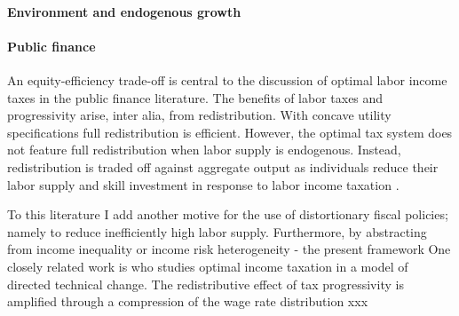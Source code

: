 \paragraph{Environment and endogenous growth}

\paragraph{Public finance}
An equity-efficiency trade-off is central to the discussion of optimal labor income taxes in the public finance literature.  The benefits of labor taxes and progressivity arise, inter alia, from redistribution. %
With concave utility specifications full redistribution is efficient. However, the optimal tax system does not feature full redistribution when labor supply is endogenous. Instead, redistribution is traded off against aggregate output as individuals reduce their labor supply and skill investment in response to labor income taxation \citep{Heathcote2017OptimalFramework, Conesa2009TaxingAll, Domeij2004OnTaxes}.

To this literature I add another motive for the use of distortionary fiscal policies; namely to reduce inefficiently high labor supply. Furthermore, by abstracting from income inequality or income risk heterogeneity - the present framework
One closely related work is \cite{Loebbing2019NationalChange} who studies optimal income taxation in a model of directed technical change. The redistributive effect of tax progressivity is amplified through a compression of the wage rate distribution xxx